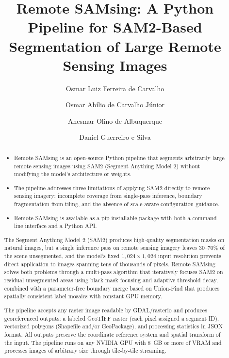 \documentclass[review,11pt,authoryear]{elsarticle}
\begin{document}
\begin{frontmatter}

\title{Remote SAMsing: A Python Pipeline for SAM2-Based Segmentation of Large Remote Sensing Images}

\author[ee]{Osmar Luiz Ferreira de Carvalho}

\author[geo]{Osmar Ab\'{i}lio de Carvalho J\'{u}nior}

\author[geo]{Anesmar Olino de Albuquerque}

\author[ee]{Daniel Guerreiro e Silva}

\address[ee]{Department of Electrical Engineering, University of Bras\'{i}lia, Bras\'{i}lia, Brazil}
\address[geo]{Department of Geography, University of Bras\'{i}lia, Bras\'{i}lia, Brazil}

\begin{abstract}
\begin{itemize}
\item Remote SAMsing is an open-source Python pipeline that segments arbitrarily large remote sensing images using SAM2 (Segment Anything Model 2) without modifying the model's architecture or weights.
\item The pipeline addresses three limitations of applying SAM2 directly to remote sensing imagery: incomplete coverage from single-pass inference, boundary fragmentation from tiling, and the absence of scale-aware configuration guidance.
\item Remote SAMsing is available as a pip-installable package with both a command-line interface and a Python API.
\end{itemize}

The Segment Anything Model 2 (SAM2) produces high-quality segmentation masks on natural images, but a single inference pass on remote sensing imagery leaves 30--70\% of the scene unsegmented, and the model's fixed $1{,}024 \times 1{,}024$ input resolution prevents direct application to images spanning tens of thousands of pixels. Remote SAMsing solves both problems through a multi-pass algorithm that iteratively focuses SAM2 on residual unsegmented areas using black mask focusing and adaptive threshold decay, combined with a parameter-free boundary merge based on Union-Find that produces spatially consistent label mosaics with constant GPU memory.

The pipeline accepts any raster image readable by GDAL/rasterio and produces georeferenced outputs: a labeled GeoTIFF raster (each pixel assigned a segment ID), vectorized polygons (Shapefile and/or GeoPackage), and processing statistics in JSON format. All outputs preserve the coordinate reference system and spatial transform of the input. The pipeline runs on any NVIDIA GPU with 8~GB or more of VRAM and processes images of arbitrary size through tile-by-tile streaming.


\end{abstract}
\end{frontmatter}
\end{document}
